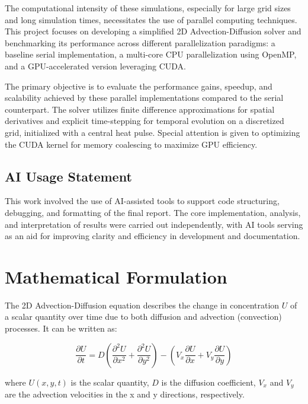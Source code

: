 \documentclass[conference]{IEEEtran}
\begin{document}
The computational intensity of these simulations, especially for large grid sizes and long simulation times, necessitates the use of parallel computing techniques. This project focuses on developing a simplified 2D Advection-Diffusion solver and benchmarking its performance across different parallelization paradigms: a baseline serial implementation, a multi-core CPU parallelization using OpenMP, and a GPU-accelerated version leveraging CUDA.

The primary objective is to evaluate the performance gains, speedup, and scalability achieved by these parallel implementations compared to the serial counterpart. The solver utilizes finite difference approximations for spatial derivatives and explicit time-stepping for temporal evolution on a discretized grid, initialized with a central heat pulse. Special attention is given to optimizing the CUDA kernel for memory coalescing to maximize GPU efficiency.

\subsection{AI Usage Statement}

This work involved the use of AI-assisted tools to support code structuring, debugging, and formatting of the final report. The core implementation, analysis, and interpretation of results were carried out independently, with AI tools serving as an aid for improving clarity and efficiency in development and documentation.

\section{Mathematical Formulation}

The 2D Advection-Diffusion equation describes the change in concentration \(U\) of a scalar quantity over time due to both diffusion and advection (convection) processes. It can be written as:

\begin{equation}
\frac{\partial U}{\partial t} = D \left( \frac{\partial^2 U}{\partial x^2} + \frac{\partial^2 U}{\partial y^2} \right) - \left( V_x \frac{\partial U}{\partial x} + V_y \frac{\partial U}{\partial y} \right)
\end{equation}

where \(U(x, y, t)\) is the scalar quantity, \(D\) is the diffusion coefficient, \(V_x\) and \(V_y\) are the advection velocities in the x and y directions, respectively.
\end{document}
